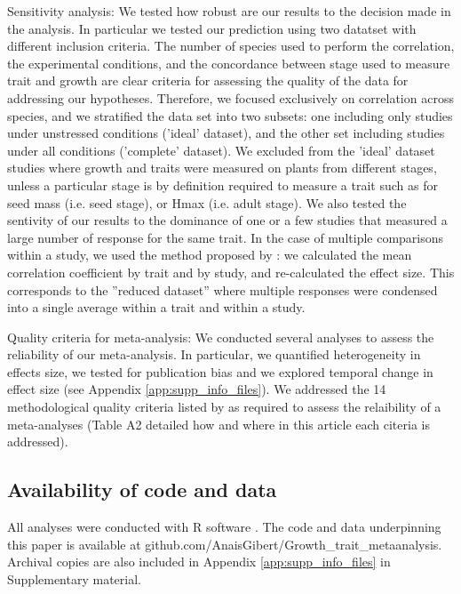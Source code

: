 \documentclass[a4paper]{article}\usepackage[]{graphicx}\usepackage[]{color}
\begin{document}
Sensitivity analysis:
We tested how robust are our results to the decision made in the analysis. In particular we tested our prediction using two datatset with different inclusion criteria. The number of species used to perform the correlation, the experimental conditions, and the concordance between stage used to measure trait and growth are clear criteria for assessing the quality of the data for addressing our hypotheses. Therefore, we focused exclusively on correlation across species, and we stratified the data set into two subsets: one including only studies under unstressed conditions ('ideal' dataset), and the other set including studies under all conditions ('complete' dataset). We excluded from the 'ideal' dataset studies where growth and traits were measured on plants from different stages, unless a particular stage is by definition required to measure a trait such as for seed mass (i.e. seed stage), or Hmax (i.e. adult stage). 
We also tested the sentivity of our results to the dominance of one or a few studies that measured a large number of response for the same trait. In the case of multiple comparisons within a study, we used the method proposed by \citet{Borenstein:2009um}: we calculated the mean correlation coefficient by trait and by study, and re-calculated the effect size. This corresponds to the ”reduced dataset” where multiple responses were condensed into a single average within a trait and within a study.

Quality criteria for meta-analysis:
We conducted several analyses to assess the reliability of our meta-analysis. In particular, we quantified heterogeneity in effects size, we tested for publication bias and we explored temporal change in effect size (see Appendix \ref{app:supp_info_files}). We addressed the 14 methodological quality criteria listed by \citet{Koricheva:2014ku} as required to assess the relaibility of a meta-analyses (Table A2 detailed how and where in this article each citeria is addressed). 


\subsection*{Availability of code and data}\label{code}

All analyses were conducted with R software \citep{Ralanguageanden:2014wf}. The code and data underpinning this paper is available at github.com/AnaisGibert/Growth\_trait\_metaanalysis. Archival copies are also included in Appendix \ref{app:supp_info_files} in Supplementary material.
\end{document}
